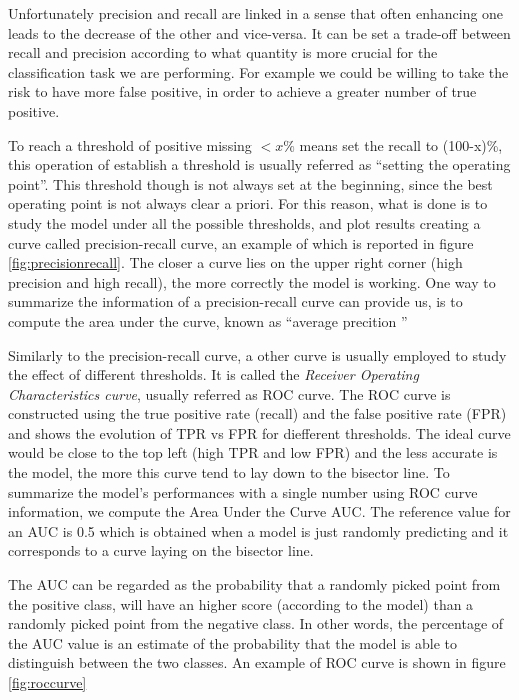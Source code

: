 \documentclass[11pt]{report}
\begin{document}
Unfortunately precision and recall are linked in a sense that often enhancing one leads to the decrease of the other and vice-versa.
It can be set a trade-off between recall and precision according to what quantity is more crucial for the classification task we are performing.
For example we could be willing to take the risk to have more false positive, in order to achieve a greater number of true positive.

To reach a threshold of positive missing $<x\%$ means set the recall to (100-x)\%, this operation of establish a threshold is usually referred as \textquotedblleft setting the operating point\textquotedblright.
This threshold though is not always set at the beginning, since the best operating point is not always clear a priori.
For this reason, what is done is to study the model under all the possible thresholds, and plot results creating a curve called precision-recall curve, an example of which is reported in figure \ref{fig:precisionrecall}.
The closer a curve lies on the upper right corner (high precision and high recall), the more correctly the model is working.
One way to summarize the information of a precision-recall curve can provide us, is to compute the area under the curve, known as \textquotedblleft average precition \textquotedblright

Similarly to the precision-recall curve, a other curve is usually employed to study the effect of different thresholds. It is called the \emph{Receiver Operating Characteristics curve}, usually referred as ROC curve.
The ROC curve is constructed using the true positive rate (recall) and the false positive rate (FPR) and shows the evolution of TPR vs FPR for diefferent thresholds.
The ideal curve would be close to the top left (high TPR and low FPR) and the less accurate is the model, the more this curve tend to lay down to the bisector line.
To summarize the model's performances with a single number using ROC curve information, we compute the Area Under the Curve AUC.
The reference value for an AUC is 0.5 which is obtained when a model is just randomly predicting and it corresponds to a curve laying on the bisector line.

The AUC can be regarded as the probability that a randomly picked point from the positive class, will have an higher score (according to the model) than a randomly picked point from the negative class.
In other words, the percentage of the AUC value is an estimate of the probability that the model is able to distinguish between the two classes.
An example of ROC curve is shown in figure \ref{fig:roccurve}
\end{document}
